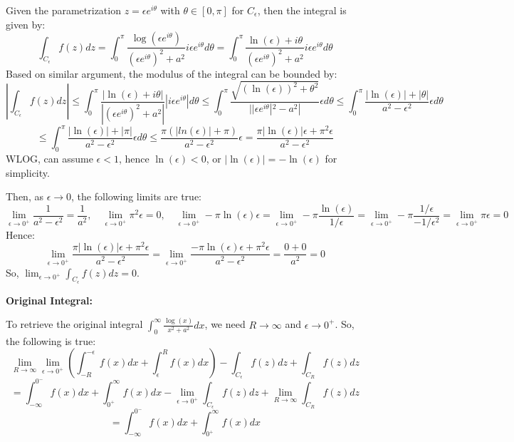 \documentclass{article}
\begin{document}
Given the parametrization $z=\epsilon e^{i\theta}$ with $\theta\in [0,\pi]$ for $C_\epsilon$, then the integral is given by:
$$\int_{C_\epsilon}f(z)dz = \int_{0}^{\pi}\frac{\log(\epsilon e^{i\theta})}{(\epsilon e^{i\theta})^2+a^2}i\epsilon e^{i\theta}d\theta=\int_{0}^{\pi}\frac{\ln(\epsilon)+i\theta}{(\epsilon e^{i\theta})^2+a^2}i\epsilon e^{i\theta}d\theta$$
Based on similar argument, the modulus of the integral can be bounded by:
$$\left|\int_{C_\epsilon}f(z)dz\right|\leq \int_{0}^{\pi}\frac{|\ln(\epsilon)+i\theta|}{|(\epsilon e^{i\theta})^2+a^2|}|i\epsilon e^{i\theta}|d\theta \leq \int_{0}^{\pi}\frac{\sqrt{(\ln(\epsilon))^2+\theta^2}}{||\epsilon e^{i\theta}|^2-a^2|}\epsilon d\theta \leq \int_{0}^{\pi}\frac{|\ln(\epsilon)|+|\theta|}{a^2-\epsilon^2}\epsilon d\theta$$
$$\leq \int_{0}^{\pi}\frac{|\ln(\epsilon)|+|\pi|}{a^2-\epsilon^2}\epsilon d\theta\leq \frac{\pi(|ln(\epsilon)|+\pi)}{a^2-\epsilon^2}\epsilon = \frac{\pi|\ln(\epsilon)|\epsilon +\pi^2\epsilon}{a^2-\epsilon^2}$$
WLOG, can assume $\epsilon<1$, hence $\ln(\epsilon)<0$, or $|\ln(\epsilon)|=-\ln(\epsilon)$ for simplicity.

Then, as $\epsilon\rightarrow 0$, the following limits are true:
$$\lim_{\epsilon\rightarrow 0^+}\frac{1}{a^2-\epsilon^2} = \frac{1}{a^2},\quad \lim_{\epsilon\rightarrow 0^+}\pi^2\epsilon = 0,\quad \lim_{\epsilon\rightarrow 0^+}-\pi\ln(\epsilon)\epsilon = \lim_{\epsilon\rightarrow 0^+}-\pi\frac{\ln(\epsilon)}{1/\epsilon} = \lim_{\epsilon\rightarrow 0^+}-\pi\frac{1/\epsilon}{-1/\epsilon^2} = \lim_{\epsilon\rightarrow 0^+}\pi \epsilon = 0$$
Hence:
$$\lim_{\epsilon\rightarrow 0^+}\frac{\pi|\ln(\epsilon)|\epsilon +\pi^2\epsilon}{a^2-\epsilon^2} = \lim_{\epsilon\rightarrow 0^+}\frac{-\pi\ln(\epsilon)\epsilon +\pi^2\epsilon}{a^2-\epsilon^2} = \frac{0+0}{a^2}=0$$
So, $\lim_{\epsilon\rightarrow 0^+}\int_{C_\epsilon}f(z)dz = 0$.

\hfil

\textbf{Original Integral:}

To retrieve the original integral $\int_{0}^{\infty}\frac{\log(x)}{x^2+a^2}dx$, we need $R\rightarrow\infty$ and $\epsilon\rightarrow 0^+$. So, the following is true:
$$\lim_{R\rightarrow\infty}\lim_{\epsilon\rightarrow 0^+}\left(\int_{-R}^{-\epsilon}f(x)dx+\int_{\epsilon}^{R}f(x)dx\right) - \int_{C_\epsilon}f(z)dz + \int_{C_R}f(z)dz$$
$$ = \int_{-\infty}^{0^-}f(x)dx + \int_{0^+}^{\infty}f(x)dx - \lim_{\epsilon\rightarrow 0^+}\int_{C_\epsilon}f(z)dz + \lim_{R\rightarrow\infty}\int_{C_R}f(z)dz$$
$$ = \int_{-\infty}^{0^-}f(x)dx + \int_{0^+}^{\infty}f(x)dx$$
\end{document}
